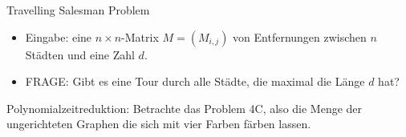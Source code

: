 \documentclass[10pt, a4paper]{exam}
\begin{document}
\begin{questions}
\begin{parts}
\begin{solution}
      Travelling Salesman Problem
      \begin{itemize}
        \item Eingabe: eine $n\times n$-Matrix $M=(M_{i,j})$ von Entfernungen zwischen $n$ Städten und eine Zahl $d$.
        \item FRAGE: Gibt es eine Tour durch alle Städte, die maximal die Länge $d$ hat?
      \end{itemize}

    \end{solution}
  \end{parts}

  \question Polynomialzeitreduktion: Betrachte das Problem 4C, also die Menge der ungerichteten Graphen die sich mit vier Farben färben lassen.
\end{questions}
\end{document}
